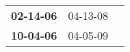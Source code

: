 \begin{supertabular}{p{0.33\columnwidth}p{0.33\columnwidth}p{0.33\columnwidth}}
 \textbf{02-14-06\textsuperscript{}} &  04-13-08\textsuperscript{} \\
 \textbf{10-04-06\textsuperscript{}} &  04-05-09\textsuperscript{} \\
\end{supertabular}
